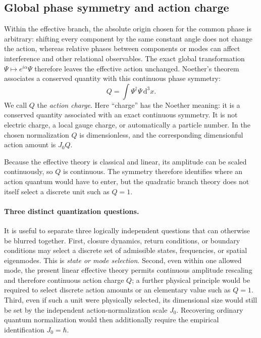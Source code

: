 \documentclass[11pt]{article}
\theoremstyle{definition}
\newcommand{\dd}{\mathrm{d}}
\begin{document}
\subsection{Global phase symmetry and action charge}

Within the effective branch, the absolute origin chosen for the common phase is arbitrary:
shifting every component by the same constant angle does not change the action, whereas
relative phases between components or modes can affect interference and other relational
observables.  The exact global transformation
$\Psi\mapsto e^{i\alpha}\Psi$ therefore leaves the effective action unchanged.  Noether's
theorem associates a conserved quantity with this continuous phase symmetry:
\begin{equation}
 \boxed{Q=\int \Psi^\dagger\Psi\,\dd^3x.}
 \label{eq:Q}
\end{equation}
We call $Q$ the \emph{action charge}.  Here ``charge'' has the Noether meaning: it is a
conserved quantity associated with an exact continuous symmetry.  It is not electric charge,
a local gauge charge, or automatically a particle number.  In the chosen normalization $Q$
is dimensionless, and the corresponding dimensionful action amount is $J_0Q$.

Because the effective theory is classical and linear, its amplitude can be scaled
continuously, so $Q$ is continuous.  The symmetry therefore identifies where an action quantum
would have to enter, but the quadratic branch theory does not itself select a discrete unit
such as $Q=1$.

\paragraph{Three distinct quantization questions.}
It is useful to separate three logically independent questions that can otherwise be
blurred together.  First, closure dynamics, return conditions, or boundary conditions
may select a discrete set of admissible states, frequencies, or spatial eigenmodes.
This is \emph{state or mode selection}.  Second, even within one allowed mode, the
present linear effective theory permits continuous amplitude rescaling and therefore
continuous action charge $Q$; a further physical principle would be required to select
discrete action amounts or an elementary value such as $Q=1$.  Third, even if such a
unit were physically selected, its dimensional size would still be set by the
independent action-normalization scale $J_0$.  Recovering ordinary quantum
normalization would then additionally require the empirical identification
$J_0=\hbar$.
\end{document}
